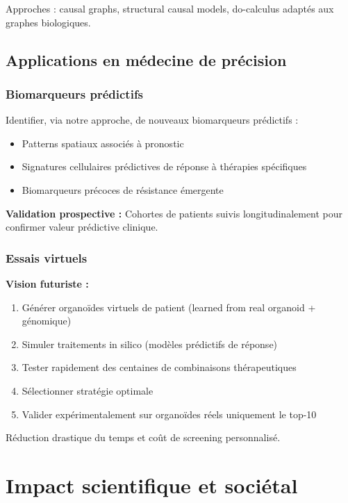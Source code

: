 Approches : causal graphs, structural causal models, do-calculus adaptés aux graphes biologiques.

\subsection{Applications en médecine de précision}

\subsubsection{Biomarqueurs prédictifs}

Identifier, via notre approche, de nouveaux biomarqueurs prédictifs :
\begin{itemize}
    \item Patterns spatiaux associés à pronostic
    \item Signatures cellulaires prédictives de réponse à thérapies spécifiques
    \item Biomarqueurs précoces de résistance émergente
\end{itemize}

\textbf{Validation prospective :}
Cohortes de patients suivis longitudinalement pour confirmer valeur prédictive clinique.

\subsubsection{Essais virtuels}

\textbf{Vision futuriste :}
\begin{enumerate}
    \item Générer organoïdes virtuels de patient (learned from real organoid + génomique)
    \item Simuler traitements in silico (modèles prédictifs de réponse)
    \item Tester rapidement des centaines de combinaisons thérapeutiques
    \item Sélectionner stratégie optimale
    \item Valider expérimentalement sur organoïdes réels uniquement le top-10
\end{enumerate}

Réduction drastique du temps et coût de screening personnalisé.

\section{Impact scientifique et sociétal}

